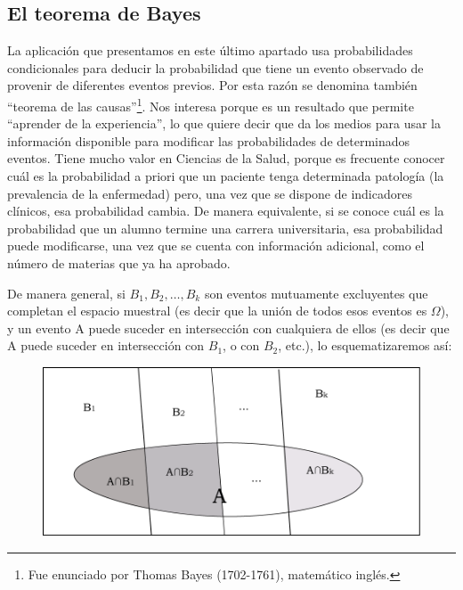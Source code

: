 \documentclass[]{article}
\let\rmarkdownfootnote\footnote%
\def\footnote{\protect\rmarkdownfootnote}
\begin{document}
\hypertarget{el-teorema-de-bayes}{%
\subsection{El teorema de Bayes}\label{el-teorema-de-bayes}}

La aplicación que presentamos en este último apartado usa probabilidades
condicionales para deducir la probabilidad que tiene un evento observado
de provenir de diferentes eventos previos. Por esta razón se denomina
también ``teorema de las causas''\footnote{Fue enunciado por Thomas
  Bayes (1702-1761), matemático inglés.}. Nos interesa porque es un
resultado que permite ``aprender de la experiencia'', lo que quiere
decir que da los medios para usar la información disponible para
modificar las probabilidades de determinados eventos. Tiene mucho valor
en Ciencias de la Salud, porque es frecuente conocer cuál es la
probabilidad a priori que un paciente tenga determinada patología (la
prevalencia de la enfermedad) pero, una vez que se dispone de
indicadores clínicos, esa probabilidad cambia. De manera equivalente, si
se conoce cuál es la probabilidad que un alumno termine una carrera
universitaria, esa probabilidad puede modificarse, una vez que se cuenta
con información adicional, como el número de materias que ya ha
aprobado.

De manera general, si \(B_{1}, B_{2}, \ldots, B_{k}\) son eventos
mutuamente excluyentes que completan el espacio muestral (es decir que
la unión de todos esos eventos es \(\Omega\)), y un evento A puede
suceder en intersección con cualquiera de ellos (es decir que A puede
suceder en intersección con \(B_{1}\), o con \(B_{2}\), etc.), lo
esquematizaremos así:

\begin{figure}

{\centering \includegraphics{imagenes/image93} 

}

\end{figure}
\end{document}
